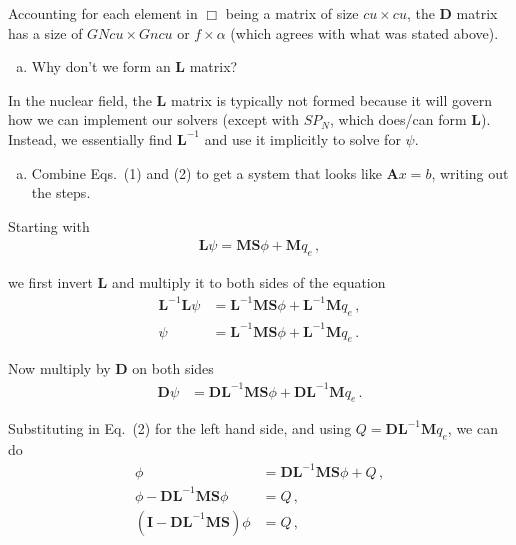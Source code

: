 \documentclass[10pt]{article}
\begin{document}
Accounting for each element in $\Box$ being a matrix of size $cu \times cu$, the $\textbf{D}$ matrix has a size of $GNcu \times Gncu$ or $f \times \alpha$ (which agrees with what was stated above).

%
%
%

\newpage
\begin{enumerate}[(d)]
\item Why don't we form an $\textbf{L}$ matrix?
\end{enumerate}

In the nuclear field, the $\textbf{L}$ matrix is typically not formed because it will govern how we can implement our solvers (except with $SP_N$, which does/can form $\textbf{L}$). Instead, we essentially find $\textbf{L}^{-1}$ and use it implicitly to solve for $\psi$.

%
%
%

\vspace{10pt}
\begin{enumerate}[(e)]
\item Combine Eqs.~(1) and (2) to get a system that looks like $\textbf{A}x = b$, writing out the steps.
\end{enumerate}

Starting with
%
\begin{align*}
    \textbf{L} \psi = \textbf{MS} \phi + \textbf{M} q_e\,,
\end{align*}

we first invert \textbf{L} and multiply it to both sides of the equation
%
\begin{align*}
    \textbf{L} ^{-1}\textbf{L} \psi &= \textbf{L} ^{-1}\textbf{MS} \phi + \textbf{L} ^{-1}\textbf{M} q_e\,, \\
     \psi &= \textbf{L} ^{-1}\textbf{MS} \phi + \textbf{L} ^{-1}\textbf{M} q_e\,.
\end{align*} 

Now multiply by \textbf{D} on both sides
%
\begin{align*}
    \textbf{D}\psi &= \textbf{D}\textbf{L} ^{-1}\textbf{MS} \phi + \textbf{D}\textbf{L} ^{-1}\textbf{M} q_e\,.
\end{align*} 

Substituting in Eq.~(2) for the left hand side, and using $Q=\textbf{D}\textbf{L} ^{-1}\textbf{M} q_e$, we can do
%
\begin{align*}
    \phi &= \textbf{D}\textbf{L} ^{-1}\textbf{MS} \phi + Q\,,\\
    \phi - \textbf{D}\textbf{L} ^{-1}\textbf{MS} \phi &= Q\,,\\
    (\textbf{I} - \textbf{D}\textbf{L} ^{-1}\textbf{MS})\phi &= Q\,,
\end{align*} 
\end{document}
